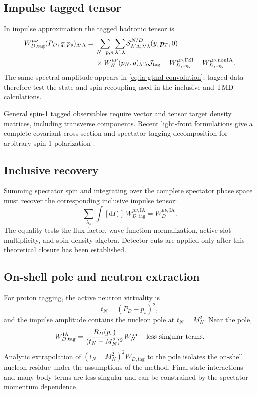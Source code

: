 \documentclass[11pt]{article}
\newcommand{\pT}{\bm{p}_{T}}
\newcommand{\dd}{\mathrm{d}}
\newcommand{\cS}{\mathcal S}
\newcommand{\cJ}{\mathcal J}
\newcommand{\IA}{\mathrm{IA}}
\newcommand{\tagg}{\mathrm{tag}}
\begin{document}
\subsection{Impulse tagged tensor}

In impulse approximation the tagged hadronic tensor is
\begin{align}
 W_{D,\tagg}^{\mu\nu}
 (P_D,q;p_s)_{\Lambda'\Lambda}
 ={}&\sum_{N=p,n}
 \sum_{\lambda',\lambda}
 \cS_{\Lambda'\Lambda;\lambda'\lambda}^{N/D}
 (y,\pT,0)
 \notag\\
 &\times
 W_N^{\mu\nu}(p_N,q)_{\lambda'\lambda}
 \cJ_{\tagg}
 +W_{D,\tagg}^{\mu\nu,\rm FSI}
 +W_{D,\tagg}^{\mu\nu,\rm nonIA}.
\label{eq:tagged-hadronic-tensor}
\end{align}
The same spectral amplitude appears in
\cref{eq:ia-gtmd-convolution}; tagged data therefore test the state and spin
recoupling used in the inclusive and TMD calculations.

General spin-1 tagged observables require vector and tensor target density
matrices, including transverse components.  Recent light-front formulations
give a complete covariant cross-section and spectator-tagging decomposition
for arbitrary spin-1 polarization
\cite{CosynWeiss2020,CosynWeiss2026I,CosynWeiss2026II}.

\subsection{Inclusive recovery}

Summing spectator spin and integrating over the complete spectator phase
space must recover the corresponding inclusive impulse tensor:
\begin{equation}
 \sum_{\lambda_s}
 \int[\dd\Gamma_s]\,
 W_{D,\tagg}^{\mu\nu,\IA}
 =W_D^{\mu\nu,\IA}.
\label{eq:tagged-inclusive-sumrule}
\end{equation}
The equality tests the flux factor, wave-function normalization, active-slot
multiplicity, and spin-density algebra.  Detector cuts are applied only after
this theoretical closure has been established.

\subsection{On-shell pole and neutron extraction}

For proton tagging, the active neutron virtuality is
\begin{equation}
 t_N=(P_D-p_s)^2,
\label{eq:active-neutron-virtuality}
\end{equation}
and the impulse amplitude contains the nucleon pole at \(t_N=M_N^2\).  Near
the pole,
\begin{equation}
 W_{D,\tagg}^{\IA}
 =\frac{R_D(p_s)}{(t_N-M_N^2)^2}
 W_N^{\rm on}
 +\text{less singular terms}.
\label{eq:tagged-pole-form}
\end{equation}
Analytic extrapolation of
\((t_N-M_N^2)^2W_{D,\tagg}\) to the pole isolates the on-shell nucleon residue
under the assumptions of the method.  Final-state interactions and many-body
terms are less singular and can be constrained by the spectator-momentum
dependence \cite{CosynSargsianWeiss2016,CosynWeiss2020}.
\end{document}
